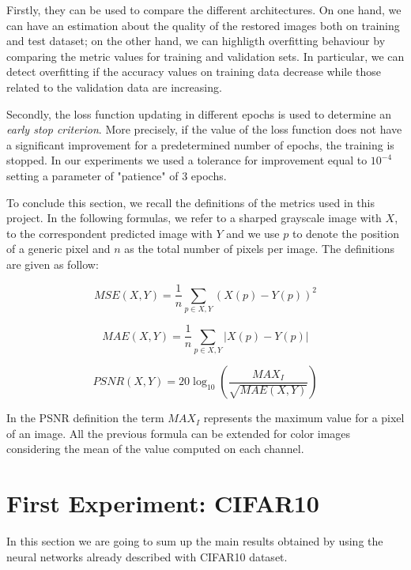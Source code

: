 \documentclass[12pt,a4paper]{article}
\begin{document}
Firstly, they can be used to compare the different architectures. On one hand, we can have an estimation about the quality of the restored images both on training and test dataset; on the other hand, we can highligth overfitting behaviour by comparing the metric values for training and validation sets. In particular, we can detect overfitting if the accuracy values on training data decrease while those related to the validation data are increasing.


Secondly, the loss function updating in different epochs is used to determine an \textit{early stop criterion}. More precisely, if the value of the loss function does not have a significant improvement for a predetermined number of epochs, the training is stopped. In our experiments we used a tolerance for improvement equal to $10 ^ {- 4}$ setting a parameter of "patience" of $3$ epochs.

To conclude this section, we recall the definitions of the metrics used in this project. In the following formulas, we refer to a sharped grayscale image with $X$, to the correspondent predicted image with $Y$ and we use $p$ to denote the position of a generic pixel and $n$ as the total number of pixels per image. The definitions are given as follow:
 
\begin{equation}
MSE(X,Y) = \frac{1}{n}\sum_{p\in X,Y} (X(p)-Y(p))^2
\end{equation}

\begin{equation}
MAE(X,Y) = \frac{1}{n}\sum_{p\in X,Y} |X(p)-Y(p)|
\end{equation}

\begin{equation}
PSNR(X,Y) = 20 \log_{10} \left( \frac{MAX_I}{\sqrt{MAE(X,Y)}}\right) 
\end{equation}

In the PSNR definition the term $MAX_I$ represents the maximum value for a pixel of an image. All the previous formula can be extended for color images considering the mean of the value computed on each channel.

\section{First Experiment: CIFAR10}
In this section we are going to sum up the main results obtained by using the neural networks already described with CIFAR10 dataset.
\end{document}
